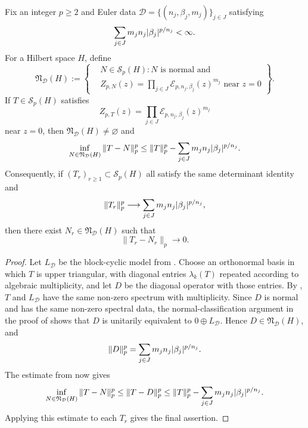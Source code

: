 \begin{corollary}
  \label{cor:schatten-coercive-rigidity}
  Fix an integer \(p\ge 2\) and Euler data
  \(
    \mathcal D=\{(n_j,\beta_j,m_j)\}_{j\in J}
  \)
  satisfying
  \[
    \sum_{j\in J}m_jn_j\lvert \beta_j \rvert^{p/n_j}<\infty.
  \]
  For a Hilbert space \(H\), define
  \[
    \mathfrak N_{\mathcal D}(H)
    :=\left\{
    \begin{aligned}
      &N\in \mathcal S_p(H): N\text{ is normal and } \\
      &Z_{p,N}(z)
      =\prod_{j\in J}\mathcal E_{p,n_j,\beta_j}(z)^{m_j}
      \text{ near }z=0
    \end{aligned}
    \right\}.
  \]
  If \(T\in \mathcal S_p(H)\) satisfies
  \[
    Z_{p,T}(z)
    =\prod_{j\in J}\mathcal E_{p,n_j,\beta_j}(z)^{m_j}
  \]
  near \(z=0\), then \(\mathfrak N_{\mathcal D}(H)\neq\varnothing\) and
  \[
    \inf_{N\in \mathfrak N_{\mathcal D}(H)}\|T-N\|_p^p
    \le \|T\|_p^p-\sum_{j\in J}m_jn_j\lvert \beta_j \rvert^{p/n_j}.
  \]
  Consequently, if \((T_r)_{r\ge 1}\subset \mathcal S_p(H)\) all satisfy
  the same determinant identity and
  \[
    \|T_r\|_p^p
    \longrightarrow \sum_{j\in J}m_jn_j\lvert \beta_j \rvert^{p/n_j},
  \]
  then there exist \(N_r\in \mathfrak N_{\mathcal D}(H)\) such that
  \[
    \|T_r-N_r\|_p\to 0.
  \]
\end{corollary}

\begin{proof}
  Let \(L_{\mathcal D}\) be the block-cyclic model from
  . Choose an orthonormal basis in which
  \(T\) is upper triangular, with diagonal entries \(\lambda_k(T)\)
  repeated according to algebraic multiplicity, and let \(D\) be the
  diagonal operator with those entries. By
  , \(T\) and \(L_{\mathcal D}\) have the
  same non-zero spectrum with multiplicity. Since \(D\) is normal and
  has the same non-zero spectral data, the normal-classification
  argument in the proof of  shows that
  \(D\) is unitarily equivalent to \(0\oplus L_{\mathcal D}\). Hence
  \(D\in \mathfrak N_{\mathcal D}(H)\), and
  \[
    \|D\|_p^p=\sum_{j\in J}m_jn_j\lvert \beta_j \rvert^{p/n_j}.
  \]
  The estimate from  now gives
  \[
    \inf_{N\in \mathfrak N_{\mathcal D}(H)}\|T-N\|_p^p
    \le \|T-D\|_p^p
    \le \|T\|_p^p-\sum_{j\in J}m_jn_j\lvert \beta_j \rvert^{p/n_j}.
  \]
  Applying this estimate to each \(T_r\) gives the final assertion.
\end{proof}

